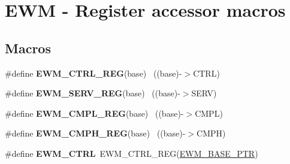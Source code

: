 \hypertarget{group___e_w_m___register___accessor___macros}{}\section{E\+W\+M -\/ Register accessor macros}
\label{group___e_w_m___register___accessor___macros}
\subsection*{Macros}
\begin{DoxyCompactItemize}
\item 
\hypertarget{group___e_w_m___register___accessor___macros_ga70c97c2b09cf89e94b72c64c3f988fb5}{}\#define {\bfseries E\+W\+M\+\_\+\+C\+T\+R\+L\+\_\+\+R\+E\+G}(base)                                          ~((base)-\/$>$C\+T\+R\+L)\label{group___e_w_m___register___accessor___macros_ga70c97c2b09cf89e94b72c64c3f988fb5}

\item 
\hypertarget{group___e_w_m___register___accessor___macros_ga5a4ece1040c414bead7538079a9f4382}{}\#define {\bfseries E\+W\+M\+\_\+\+S\+E\+R\+V\+\_\+\+R\+E\+G}(base)                                          ~((base)-\/$>$S\+E\+R\+V)\label{group___e_w_m___register___accessor___macros_ga5a4ece1040c414bead7538079a9f4382}

\item 
\hypertarget{group___e_w_m___register___accessor___macros_ga69212f48d4040eed832bd069e884bd47}{}\#define {\bfseries E\+W\+M\+\_\+\+C\+M\+P\+L\+\_\+\+R\+E\+G}(base)                                          ~((base)-\/$>$C\+M\+P\+L)\label{group___e_w_m___register___accessor___macros_ga69212f48d4040eed832bd069e884bd47}

\item 
\hypertarget{group___e_w_m___register___accessor___macros_gaec5eda9deb27ee641ebf5250bb0e1912}{}\#define {\bfseries E\+W\+M\+\_\+\+C\+M\+P\+H\+\_\+\+R\+E\+G}(base)                                          ~((base)-\/$>$C\+M\+P\+H)\label{group___e_w_m___register___accessor___macros_gaec5eda9deb27ee641ebf5250bb0e1912}

\item 
\hypertarget{group___e_w_m___register___accessor___macros_ga643f3468793754e6d82c2fd8cefb5df7}{}\#define {\bfseries E\+W\+M\+\_\+\+C\+T\+R\+L}~E\+W\+M\+\_\+\+C\+T\+R\+L\+\_\+\+R\+E\+G(\hyperlink{group___e_w_m___peripheral_gae3454b5b37183b746362498d1fafc40c}{E\+W\+M\+\_\+\+B\+A\+S\+E\+\_\+\+P\+T\+R})\label{group___e_w_m___register___accessor___macros_ga643f3468793754e6d82c2fd8cefb5df7}


\end{DoxyCompactItemize}
